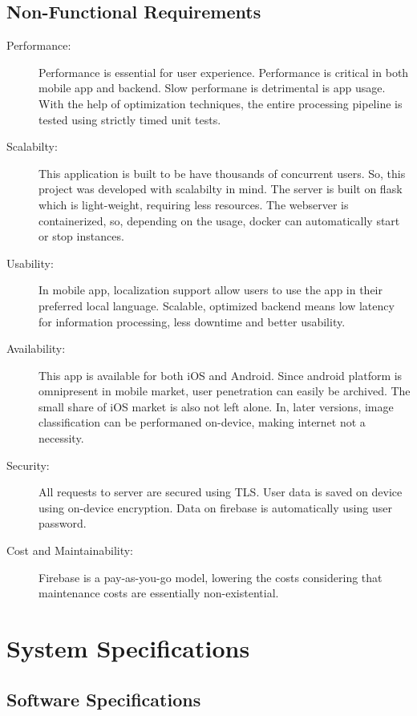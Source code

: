 \documentclass[../Report.tex]{subfiles}
\begin{document}
\subsection{Non-Functional Requirements}
\begin{description}
  \item[Performance: ] Performance is essential for user experience. Performance is critical in both mobile app and backend. Slow performane 
  is detrimental is app usage. With the help of optimization techniques, the entire processing pipeline is tested using strictly timed 
  unit tests.
  
  \item[Scalabilty: ] This application is built to be have thousands of concurrent users. So, this project was developed with scalabilty in 
  mind. The server is built on flask which is light-weight, requiring less resources. The webserver is containerized, so, depending on the 
  usage, docker can automatically start or stop instances.

  \item[Usability: ] In mobile app, localization support allow users to use the app in their preferred local language. Scalable, optimized 
  backend means low latency for information processing, less downtime and better usability.

  \item[Availability: ] This app is available for both iOS and Android. Since android platform is omnipresent in mobile market, user 
  penetration can easily be archived. The small share of iOS market is also not left alone. In, later versions, image classification
  can be performaned on-device, making internet not a necessity.

  \item[Security: ] All requests to server are secured using TLS. User data is saved on device using on-device encryption. Data on 
  firebase is automatically using user password.

  \item[Cost and Maintainability: ] Firebase is a pay-as-you-go model, lowering the costs considering that maintenance costs are 
  essentially non-existential.
\end{description} 

\section{System Specifications}

\subsection{Software Specifications}
\end{document}
